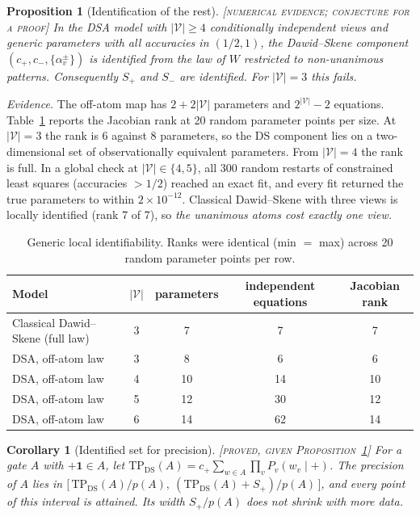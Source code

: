\documentclass[11pt]{article}
\newtheorem{proposition}{Proposition}
\newtheorem{corollary}{Corollary}
\theoremstyle{definition}
\theoremstyle{remark}
\newcommand{\status}[1]{\hfill{\normalfont\small\textsc{[#1]}}}
\newcommand{\cV}{\mathcal{V}}
\newcommand{\one}{\mathbf{1}}
\begin{document}
\begin{proposition}[Identification of the rest]\label{prop:id}\status{numerical evidence; conjecture for a proof}
In the DSA model with $|\cV|\ge 4$ conditionally independent views and generic parameters with all accuracies in $(1/2,1)$, the Dawid--Skene component $(c_+,c_-,\{\alpha_v^{\pm}\})$ is identified from the law of $W$ restricted to non-unanimous patterns. Consequently $S_+$ and $S_-$ are identified. For $|\cV|=3$ this fails.
\end{proposition}

\noindent\emph{Evidence.} The off-atom map has $2+2|\cV|$ parameters and $2^{|\cV|}-2$ equations. Table~\ref{tab:rank} reports the Jacobian rank at 20 random parameter points per size. At $|\cV|=3$ the rank is 6 against 8 parameters, so the DS component lies on a two-dimensional set of observationally equivalent parameters. From $|\cV|=4$ the rank is full. In a global check at $|\cV|\in\{4,5\}$, all 300 random restarts of constrained least squares (accuracies $>1/2$) reached an exact fit, and every fit returned the true parameters to within $2\times10^{-12}$. Classical Dawid--Skene with three views is locally identified (rank 7 of 7), so \emph{the unanimous atoms cost exactly one view.}

\begin{table}[t]
\centering\small
\begin{tabular}{@{}lcccc@{}}
\toprule
Model & $|\cV|$ & parameters & independent equations & Jacobian rank\\
\midrule
Classical Dawid--Skene (full law) & 3 & 7 & 7 & 7\\
DSA, off-atom law & 3 & 8 & 6 & 6\\
DSA, off-atom law & 4 & 10 & 14 & 10\\
DSA, off-atom law & 5 & 12 & 30 & 12\\
DSA, off-atom law & 6 & 14 & 62 & 14\\
\bottomrule
\end{tabular}
\caption{Generic local identifiability. Ranks were identical (min $=$ max) across 20 random parameter points per row.}
\label{tab:rank}
\end{table}

\begin{corollary}[Identified set for precision]\label{cor:prec}\status{proved, given Proposition~\ref{prop:id}}
For a gate $A$ with $+\one\in A$, let $\mathrm{TP}_{\mathrm{DS}}(A)=c_+\sum_{w\in A}\prod_v P_v(w_v\mid+)$. The precision of $A$ lies in
$\bigl[\,\mathrm{TP}_{\mathrm{DS}}(A)/p(A),\ (\mathrm{TP}_{\mathrm{DS}}(A)+S_+)/p(A)\,\bigr]$, and every point of this interval is attained. Its width $S_+/p(A)$ does not shrink with more data.
\end{corollary}
\end{document}
